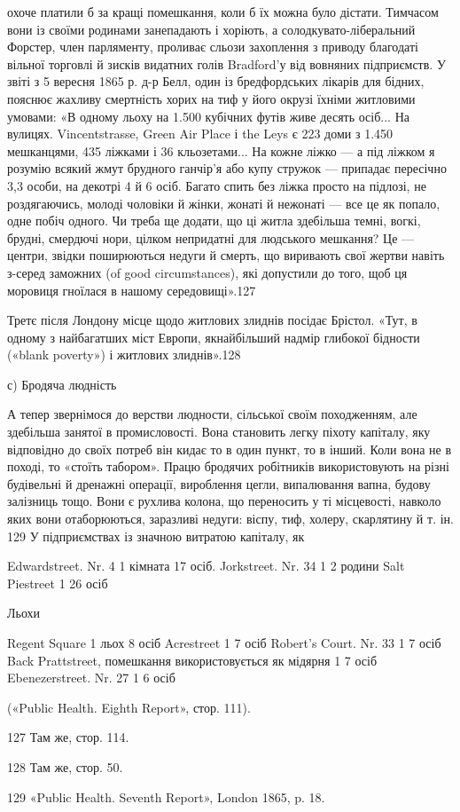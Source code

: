 охоче платили б за кращі помешкання, коли б їх можна було
дістати. Тимчасом вони із своїми родинами занепадають і хоріють,
а солодкувато-ліберальний Форстер, член парляменту, проливає
сльози захоплення з приводу благодаті вільної торговлі й зисків
видатних голів Bradford’у від вовняних підприємств. У звіті
з 5 вересня 1865 р. д-р Белл, один із бредфордських лікарів для
бідних, пояснює жахливу смертність хорих на тиф у його окрузі
їхніми житловими умовами: «В одному льоху на 1.500 кубічних
футів живе десять осіб... На вулицях. Vincentstrasse, Green
Air Place і the Leys є 223 доми з 1.450 мешканцями, 435 ліжками
і 36 кльозетами... На кожне ліжко — а під ліжком я розумію
всякий жмут брудного ганчір’я або купу стружок — припадає
пересічно 3,3 особи, на декотрі 4 й 6 осіб. Багато спить без ліжка
просто на підлозі, не роздягаючись, молоді чоловіки й жінки,
жонаті й нежонаті — все це як попало, одне побіч одного. Чи
треба ще додати, що ці житла здебільша темні, вогкі, брудні,
смердючі нори, цілком непридатні для людського мешкання?
Це — центри, звідки поширюються недуги й смерть, що виривають
свої жертви навіть з-серед заможних (of good circumstances),
які допустили до того, щоб ця моровиця гноїлася в нашому
середовищі».127

Третє після Лондону місце щодо житлових злиднів посідає
Брістол. «Тут, в одному з найбагатших міст Европи, якнайбільший
надмір глибокої бідности («blank poverty») і житлових
злиднів».128

с) Бродяча людність

А тепер звернімося до верстви людности, сільської своїм походженням,
але здебільша занятої в промисловості. Вона становить
легку піхоту капіталу, яку відповідно до своїх потреб
він кидає то в один пункт, то в інший. Коли вона не в поході,
то «стоїть табором». Працю бродячих робітників використовують
на різні будівельні й дренажні операції, вироблення цегли,
випалювання вапна, будову залізниць тощо. Вони є рухлива
колона, що переносить у ті місцевості, навколо яких вони отаборюються,
заразливі недуги: віспу, тиф, холеру, скарлятину
й т. ін. 129 У підприємствах із значною витратою капіталу, як

Edwardstreet. Nr. 4        1    кімната    17 осіб.
Jorkstreet. Nr. 34        1        2 родини
Salt Piestreet      1  26 осіб

Льохи

Regent Square        1    льох    8 осіб
Acrestreet        1        7 осіб
Robert’s Court. Nr. 33    1     7 осіб
Back Prattstreet, помешкання
використовується як мідярня    1         7 осіб
Ebenezerstreet. Nr. 27           1            6 осіб

(«Public Health. Eighth Report», стор. 111).

127 Там же, стор. 114.

128 Там же, стор. 50.

129 «Public Health. Seventh Report», London 1865, p. 18.
